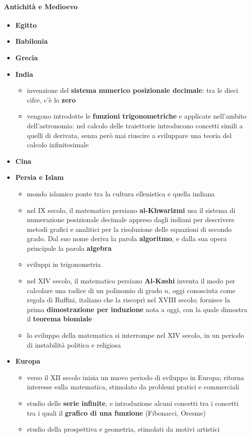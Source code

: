 \paragraph{Antichità e Medioevo}
\begin{itemize}
  \item \textbf{Egitto}
  \item \textbf{Babilonia}
  \item \textbf{Grecia}
  \item \textbf{India}
      \begin{itemize}
          \item invenzione del \textbf{sistema numerico posizionale decimale}: tra le dieci cifre, c'è lo \textbf{zero}
          \item vengono introdotte le \textbf{funzioni trigonometriche} e applicate nell'ambito dell'astronomia: nel calcolo delle traiettorie introducono concetti simili a quelli di derivata, senza però mai riuscire a sviluppare una teoria del calcolo infinitesimale
      \end{itemize}
  \item \textbf{Cina}
  \item \textbf{Persia e Islam}
      \begin{itemize}
          \item mondo islamico ponte tra la cultura ellenistica e quella indiana
          \item nel IX secolo, il matematico persiano \textbf{al-Khwarizmi} usa il sistema di numerazione posizionale decimale appreso dagli indiani per descrivere metodi grafici e analitici per la risoluzione delle equazioni di secondo grado. Dal suo nome deriva la parola \textbf{algoritmo}, e dalla sua opera principale la parola \textbf{algebra}
          \item sviluppi in trigonometria
          \item nel XIV secolo, il matematico persiano \textbf{Al-Kashi} inventa il modo per calcolare una radice di un polinomio di grado $n$, oggi conosciuta come regola di Ruffini, italiano che la riscoprì nel XVIII secolo; fornisce la prima \textbf{dimostrazione per induzione} nota a oggi, con la quale dimostra il \textbf{teorema biomiale}
          \item lo sviluppo della matematica si interrompe nel XIV secolo, in un periodo di instabilità politica e religiosa
      \end{itemize}
  \item \textbf{Europa}
      \begin{itemize}
          \item verso il XII secolo inizia un nuovo periodo di sviluppo in Europa; ritorna interesse sulla matematica, stimolato da problemi pratici e commerciali
          \item studio delle \textbf{serie infinite}, e introduzione alcuni concetti tra i concetti tra i quali il \textbf{grafico di una funzione} (Fibonacci, Oresme)
          \item studio della prospettiva e geometria, stimolati da motivi artistici
      \end{itemize}
\end{itemize}
